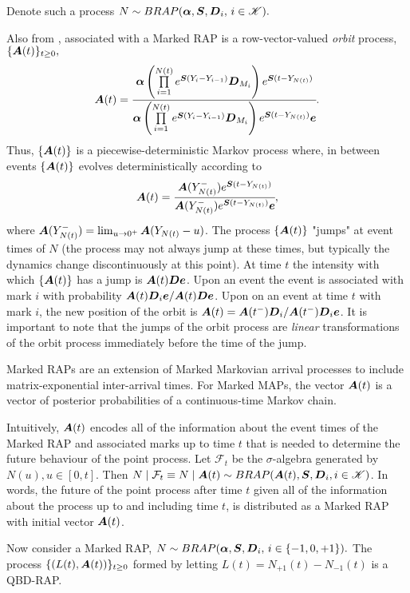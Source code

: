 Denote such a process \(N\sim BRAP(\boldsymbol \alpha, \boldsymbol S, \boldsymbol D_i,\,i\in\mathscr K).\)

Also from \cite{bn2010}, associated with a Marked RAP is a row-vector-valued \emph{orbit} process, \(\{\boldsymbol A(t)\}_{t\geq0},\)
\[\boldsymbol A(t) = \cfrac{\boldsymbol \alpha\left( \prod\limits_{i=1}^{N(t)} e^{\boldsymbol S(Y_{i}-Y_{i-1})}\boldsymbol D_{M_i}\right)e^{\boldsymbol S (t-Y_{N(t)})}}{\boldsymbol \alpha\left( \prod\limits_{i=1}^{N(t)} e^{\boldsymbol S(Y_{i}-Y_{i-1})}\boldsymbol D_{M_i}\right)e^{\boldsymbol S( t-Y_{N(t)})}\boldsymbol e}.\]
Thus, \(\{\boldsymbol A(t)\}\) is a piecewise-deterministic Markov process where, in between events \(\{\boldsymbol A(t)\}\) evolves deterministically according to 
\[\boldsymbol A(t) = \cfrac{\boldsymbol A(Y_{N(t)}^-)e^{\boldsymbol S(t-Y_{N(t)})}}{\boldsymbol A(Y_{N(t)}^-)e^{\boldsymbol S(t-Y_{N(t)})}\boldsymbol e},\]
where \(\boldsymbol A(Y_{N(t)}^-) = \lim_{u\to 0^+}\boldsymbol A(Y_{N(t)}-u)\). The process \(\{\boldsymbol A(t)\}\) "jumps" at event times of \(N\) (the process may not always jump at these times, but typically the dynamics change discontinuously at this point). At time \(t\) the intensity with which \(\{\boldsymbol A(t)\}\) has a jump is \(\boldsymbol A(t) \boldsymbol D\boldsymbol e\). Upon an event the event is associated with mark \(i\) with probability \(\boldsymbol A(t) \boldsymbol D_i\boldsymbol e/\boldsymbol A(t) \boldsymbol D\boldsymbol e\). Upon on an event at time \(t\) with mark \(i\), the new position of the orbit is \(\boldsymbol A(t) = \boldsymbol A(t^-) \boldsymbol D_i/\boldsymbol A(t^-) \boldsymbol D_i\boldsymbol e\). It is important to note that the jumps of the orbit process are \emph{linear} transformations of the orbit process immediately before the time of the jump. 

Marked RAPs are an extension of Marked Markovian arrival processes to include matrix-exponential inter-arrival times. For Marked MAPs, the vector \(\boldsymbol A(t)\) is a vector of posterior probabilities of a continuous-time Markov chain. 

Intuitively, \(\boldsymbol A(t)\) encodes all of the information about the event times of the Marked RAP and associated marks up to time \(t\) that is needed to determine the future behaviour of the point process. Let \(\mathcal F_{t}\) be the \(\sigma\)-algebra generated by \(N(u), u\in[0,t]\). Then \(N\mid \mathcal F_t \equiv N\mid \boldsymbol A(t) \sim BRAP(\boldsymbol A(t), \boldsymbol S, \boldsymbol D_i,i\in\mathscr K)\). In words, the future of the point process after time \(t\) given all of the information about the process up to and including time \(t\), is distributed as a Marked RAP with initial vector \(\boldsymbol A(t)\). 

Now consider a Marked RAP, \(N\sim BRAP(\boldsymbol \alpha, \boldsymbol S, \boldsymbol D_i,\,i\in\{-1,0,+1\}).\) The process \(\{(L(t),\boldsymbol A(t))\}_{t\geq0}\) formed by letting \(L(t) = N_{+1}(t) - N_{-1}(t)\) is a QBD-RAP. 


